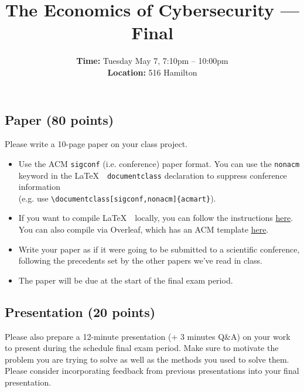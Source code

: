 \documentclass[11pt]{article}
\title{The Economics of Cybersecurity --- Final}
\date{{\bf Time:} Tuesday May 7, 7:10pm -- 10:00pm \\ {\bf Location:} 516 Hamilton}
\begin{document}
\maketitle



\subsection*{Paper (80 points)}

Please write a 10-page paper on your class project. 
\begin{itemize}
    \item Use the ACM \texttt{sigconf} (i.e. conference) paper format. You can use the \texttt{nonacm} keyword in the \LaTeX \ \ \texttt{documentclass} declaration to suppress conference information \\ (e.g. use \texttt{\textbackslash documentclass[sigconf,nonacm]\{acmart\}}).
    \item If you want to compile \LaTeX \ \  locally, you can follow the instructions \href{https://www.acm.org/publications/proceedings-template}{here}. You can also compile via Overleaf, which has an ACM template \href{https://www.overleaf.com/latex/templates/association-for-computing-machinery-acm-sig-proceedings-template/bmvfhcdnxfty}{here}.
    \item Write your paper as if it were going to be submitted to a scientific conference, following the precedents set by the other papers we've read in class. 
    \item The paper will be due at the start of the final exam period. 
\end{itemize}

\subsection*{Presentation (20 points)}

Please also prepare a 12-minute presentation (+ 3 minutes Q\&A) on your work to present during the schedule final exam period. Make sure to motivate the problem you are trying to solve as well as the methods you used to solve them. Please consider incorporating feedback from previous presentations into your final presentation.

\end{document}
